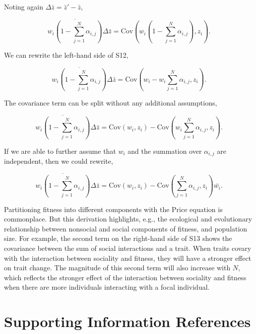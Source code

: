 \documentclass[
]{article}
\begin{document}
Noting again \(\Delta \bar{z} = \bar{z}' - \bar{z}\),

\[\overline{w_{i}\left(1 - \sum_{j=1}^{N}\alpha_{i, j}\right)}\Delta\bar{z} = \mathrm{Cov}\left(w_{i}\left(1 - \sum_{j=1}^{N}\alpha_{i, j}\right), z_{i}  \right). 
\tag{S12}
\]

We can rewrite the left-hand side of S12,

\[\overline{w_{i}\left(1 - \sum_{j=1}^{N}\alpha_{i, j}\right)}\Delta\bar{z} = \mathrm{Cov}\left(w_{i} - w_{i}\sum_{j=1}^{N}\alpha_{i, j}, z_{i}  \right). 
\tag{S13}
\]

The covariance term can be split without any additional assumptions,

\[\overline{w_{i}\left(1 - \sum_{j=1}^{N}\alpha_{i, j}\right)}\Delta\bar{z} = \mathrm{Cov}\left(w_{i}, z_{i}  \right) - \mathrm{Cov}\left(w_{i}\sum_{j=1}^{N}\alpha_{i, j}, z_{i}  \right). 
\tag{S14}
\]

If we are able to further assume that \(w_{i}\) and the summation over
\(\alpha_{i,j}\) are independent, then we could rewrite,

\[\overline{w_{i}\left(1 - \sum_{j=1}^{N}\alpha_{i, j}\right)}\Delta\bar{z} = \mathrm{Cov}\left(w_{i}, z_{i}  \right) - \mathrm{Cov}\left(\sum_{j=1}^{N}\alpha_{i, j}, z_{i}  \right)\bar{w_{i}}. 
\tag{S15}
\]

Partitioning fitness into different components with the Price equation
is commonplace. But this derivation highlights, e.g., the ecological and
evolutionary relationship between nonsocial and social components of
fitness, and population size. For example, the second term on the
right-hand side of S13 shows the covariance between the sum of social
interactions and a trait. When traits covary with the interaction
between sociality and fitness, they will have a stronger effect on trait
change. The magnitude of this second term will also increase with \(N\),
which reflects the stronger effect of the interaction between sociality
and fitness when there are more individuals interacting with a focal
individual.

\section{Supporting Information
References}\label{supporting-information-references}


\label{refs}
\end{document}
